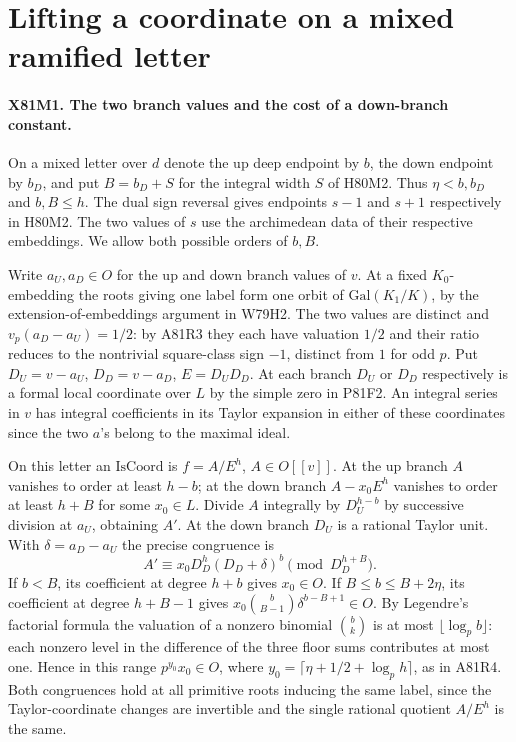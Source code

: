 \section{Lifting a coordinate on a mixed ramified letter}

\paragraph{X81M1. The two branch values and the cost of a down-branch constant.}
On a mixed letter over $d$ denote the up deep endpoint by $b$,
the down endpoint by $b_D$, and put $B=b_D+S$ for the integral
width $S$ of H80M2. Thus $\eta<b,b_D$ and $b,B\le h$.
The dual sign reversal gives endpoints $s-1$ and $s+1$ respectively
in H80M2. The two values of $s$ use the archimedean data of their
respective embeddings. We allow both possible orders of $b,B$.

Write $a_U,a_D\in O$ for the up and down branch values of $v$.
At a fixed $K_0$-embedding the roots giving one label form one
orbit of $\mathrm{Gal}(K_1/K)$, by the extension-of-embeddings
argument in W79H2. The two values are distinct and
$v_p(a_D-a_U)=1/2$: by A81R3 they each have valuation $1/2$ and
their ratio reduces to the nontrivial square-class sign $-1$,
distinct from $1$ for odd $p$. Put $D_U=v-a_U$, $D_D=v-a_D$,
$E=D_U D_D$. At each branch $D_U$ or $D_D$ respectively is a
formal local coordinate over $L$ by the simple zero in P81F2.
An integral series in $v$ has integral coefficients in its
Taylor expansion in either of these coordinates since the two
$a$'s belong to the maximal ideal.

On this letter an $\mathrm{IsCoord}$ is $f=A/E^h$, $A\in O[[v]]$.
At the up branch $A$ vanishes to order at least $h-b$; at the
down branch $A-x_0E^h$ vanishes to order at least $h+B$ for
some $x_0\in L$. Divide $A$ integrally by $D_U^{h-b}$
by successive division at $a_U$, obtaining $A'$. At the down
branch $D_U$ is a rational Taylor unit. With
$\delta=a_D-a_U$ the precise congruence is
\[
      A'\equiv x_0 D_D^h(D_D+\delta)^b\pmod{D_D^{h+B}}.
\]
If $b<B$, its coefficient at degree $h+b$ gives $x_0\in O$.
If $B\le b\le B+2\eta$, its coefficient at degree $h+B-1$
gives $x_0\binom b{B-1}\delta^{b-B+1}\in O$.
By Legendre's factorial formula the valuation of a nonzero
binomial $\binom b k$ is at most $\lfloor\log_p b\rfloor$:
each nonzero level in the difference of the three floor sums
contributes at most one. Hence in this range
$p^{y_0}x_0\in O$, where
$y_0=\lceil\eta+1/2+\log_p h\rceil$, as in A81R4.
Both congruences hold at all primitive roots inducing the same
label, since the Taylor-coordinate changes are invertible and
the single rational quotient $A/E^h$ is the same.

